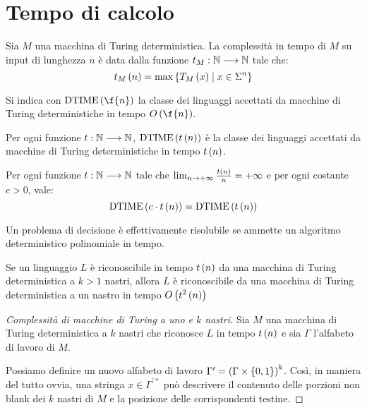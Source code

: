\documentclass{lectures}
\begin{document}
\section{Tempo di calcolo}
\begin{multicols}{2}
\begin{definition}
    Sia \(M\) una macchina di Turing deterministica. La complessità in tempo di \(M\) su input di lunghezza \(n\) è data dalla funzione \(t_M:\mathbb{N}\longrightarrow \mathbb{N}\) tale che:
    \[
        t_M\left(n\right) = \max\left\{T_M\left(x\right)\mid x \in \Sigma^n\right\}
    \]
\end{definition}
\begin{definition}[DTIME]
    Si indica con \(\text{DTIME}\rnd{\f{n}}\) la classe dei linguaggi accettati da macchine di Turing deterministiche in tempo \(O\rnd{\f{n}}\).
\end{definition}
\begin{definition}
    Per ogni funzione \(t:\mathbb{N}\longrightarrow \mathbb{N}\), \(\text{DTIME}\left(t\left(n\right)\right)\) è la classe dei linguaggi accettati da macchine di Turing deterministiche in tempo \(t\left(n\right)\).
\end{definition}
\begin{proposition}
    Per ogni funzione \(t:\mathbb{N}\longrightarrow \mathbb{N}\) tale che \(\lim_{n\rightarrow +\infty} \frac{t\left(n\right)}{n} = +\infty\) e per ogni costante \(c>0\), vale:
    \[
        \text{DTIME}\left(c\cdot t\left(n\right)\right) = \text{DTIME}\left(t\left(n\right)\right)
    \]
\end{proposition}
\begin{theorem}
    Un problema di decisione è effettivamente risolubile se ammette un algoritmo deterministico polinomiale in tempo.
\end{theorem}
\begin{theorem}
    Se un linguaggio \(L\) è riconoscibile in tempo \(t\left(n\right)\) da una macchina di Turing deterministica a \(k>1\) nastri, allora \(L\) è riconoscibile da una macchina di Turing deterministica a un nastro in tempo \(O\left(t^2\left(n\right)\right)\)
\end{theorem}
\begin{proof}[Complessità di macchine di Turing a uno e \(k\) nastri]
    Sia \(M\) una macchina di Turing deterministica a \(k\) nastri che riconosce \(L\) in tempo \(t\left(n\right)\) e sia \(\Gamma\) l'alfabeto di lavoro di \(M\). 
    
    Possiamo definire un nuovo alfabeto di lavoro \(\Gamma' = \left(\Gamma \times \left\{0,1\right\}\right)^k\). Così, in maniera del tutto ovvia, una stringa \(x \in \Gamma^{'*}\) può descrivere il contenuto delle porzioni non blank dei \(k\) nastri di \(M\) e la posizione delle corrispondenti testine.
    

\end{proof}
\end{multicols}
\end{document}
